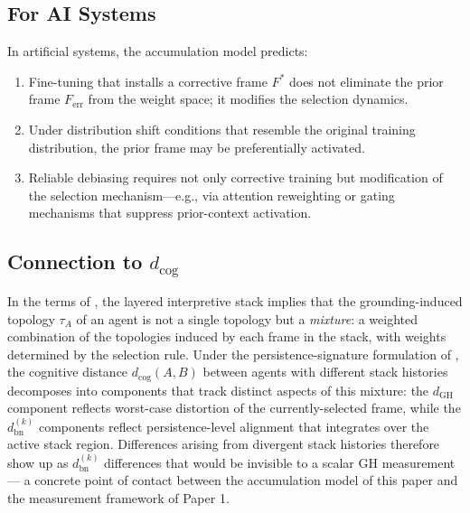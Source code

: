 \documentclass[12pt]{article}
\begin{document}
\subsection{For AI Systems}

In artificial systems, the accumulation model predicts:
\begin{enumerate}
  \item Fine-tuning that installs a corrective frame $F^*$ does
  not eliminate the prior frame $F_\mathrm{err}$ from the weight
  space; it modifies the selection dynamics.
  \item Under distribution shift conditions that resemble the
  original training distribution, the prior frame may be
  preferentially activated.
  \item Reliable debiasing requires not only corrective training
  but modification of the selection mechanism---e.g., via
  attention reweighting or gating mechanisms that suppress
  prior-context activation.
\end{enumerate}

\subsection{Connection to $d_\mathrm{cog}$}

In the terms of \cite{minamoto2026topology}, the layered
interpretive stack implies that the grounding-induced topology
$\tau_A$ of an agent is not a single topology but a \emph{mixture}:
a weighted combination of the topologies induced by each frame
in the stack, with weights determined by the selection rule.
Under the persistence-signature formulation of
\cite[Def.~\ref{def:dcog-signature}]{minamoto2026topology}, the
cognitive distance $d_\mathrm{cog}(A, B)$ between agents with
different stack histories decomposes into components that track
distinct aspects of this mixture: the $d_\mathrm{GH}$ component
reflects worst-case distortion of the currently-selected frame,
while the $d_\mathrm{bn}^{(k)}$ components reflect persistence-level
alignment that integrates over the active stack region. Differences
arising from divergent stack histories therefore show up as
$d_\mathrm{bn}^{(k)}$ differences that would be invisible to a
scalar GH measurement --- a concrete point of contact between the
accumulation model of this paper and the measurement framework of
Paper 1.
\end{document}
